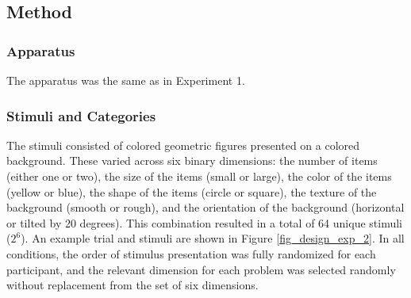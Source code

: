 \documentclass[doc, floatsintext]{apa7}
\begin{document}
\subsection{Method}

\subsubsection{Apparatus}
The apparatus was the same as in Experiment 1.

\subsubsection{Stimuli and Categories}
The stimuli consisted of colored geometric figures presented
on a colored background. These varied across six binary
dimensions: the number of items (either one or two), the
size of the items (small or large), the color of the items
(yellow or blue), the shape of the items (circle or square),
the texture of the background (smooth or rough), and the
orientation of the background (horizontal or tilted by 20
degrees). This combination resulted in a total of 64 unique
stimuli ($2^6$). An example trial and stimuli are shown in
Figure \ref{fig_design_exp_2}. In all conditions, the order
of stimulus presentation was fully randomized for each
participant, and the relevant dimension for each problem was
selected randomly without replacement from the set of six
dimensions.
\end{document}
